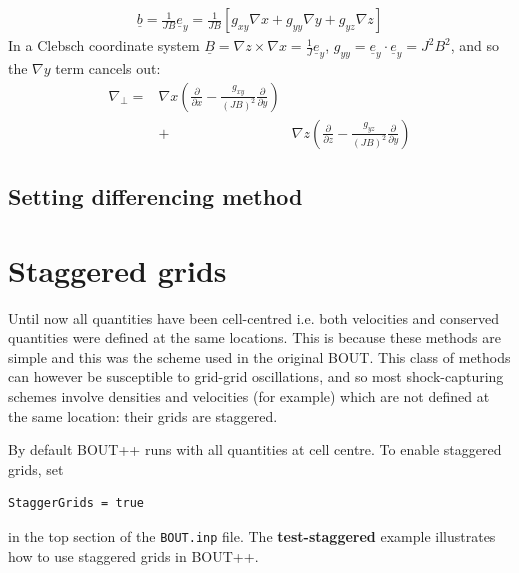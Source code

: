 \documentclass[12pt]{article}
\newcommand{\deriv}[2]{\ensuremath{\frac{\partial #1}{\partial #2}}}
\begin{document}
%
\begin{align}
\underline{b} = \frac{1}{JB}\underline{e}_y = \frac{1}{JB}\left[g_{xy}\nabla x
+ g_{yy}\nabla y + g_{yz}\nabla z\right]
\end{align}
%
In a Clebsch coordinate system $\underline{B} = \nabla z \times \nabla x =
\frac{1}{J}\underline{e}_y$, $g_{yy} = \underline{e}_y\cdot\underline{e}_y =
J^2B^2$, and so the $\nabla y$ term cancels out:
%
\begin{eqnarray*}
\nabla_\perp =& \nabla x\left(\deriv{}{x} -
\frac{g_{xy}}{\left(JB\right)^2}\deriv{}{y}\right) \\ &+& \nabla
    z\left(\deriv{}{z} - \frac{g_{yz}}{\left(JB\right)^2}\deriv{}{y}\right)
\end{eqnarray*}
%



\subsection{Setting differencing method}
%





\section{Staggered grids}
%
\label{sec:staggergrids}
%
%
Until now all quantities have been cell-centred i.e. both velocities and
conserved quantities were defined at the same locations. This is because these
methods are simple and this was the scheme used in the original BOUT. This
class of methods can however be susceptible to grid-grid oscillations, and so
most shock-capturing schemes involve densities and velocities (for example)
which are not defined at the same location: their grids are staggered.

By default BOUT++ runs with all quantities at cell centre. To enable staggered
grids, set
%
\begin{verbatim}
StaggerGrids = true
\end{verbatim}
%
in the top section of the \texttt{BOUT.inp} file. The {\bf test-staggered}
example illustrates how to use staggered grids in BOUT++.
\end{document}
